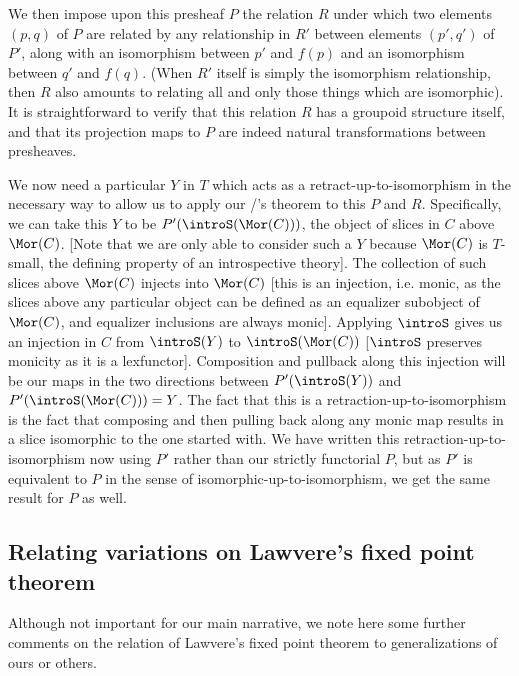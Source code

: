 We then impose upon this presheaf $P$ the relation $R$ under which two elements $(p, q)$ of $P$ are related by any relationship in $R'$ between elements $(p', q')$ of $P'$, along with an isomorphism between $p'$ and $f(p)$ and an isomorphism between $q'$ and $f(q)$. (When $R'$ itself is simply the isomorphism relationship, then $R$ also amounts to relating all and only those things which are isomorphic). It is straightforward to verify that this relation $R$ has a groupoid structure itself, and that its projection maps to $P$ are indeed natural transformations between presheaves. 

We now need a particular $Y$ in $T$ which acts as a retract-up-to-isomorphism in the necessary way to allow us to apply our \Loeb/'s theorem to this $P$ and $R$. Specifically, we can take this $Y$ to be $P'(\introS(\Mor(C)))$, the object of slices in $C$ above $\Mor(C)$. [Note that we are only able to consider such a $Y$ because $\Mor(C)$ is $T$-small, the defining property of an introspective theory]. The collection of such slices above $\Mor(C)$ injects into $\Mor(C)$ [this is an injection, i.e. monic, as the slices above any particular object can be defined as an equalizer subobject of $\Mor(C)$, and equalizer inclusions are always monic]. Applying $\introS$ gives us an injection in $C$ from $\introS(Y)$ to $\introS(\Mor(C))$ [$\introS$ preserves monicity as it is a lexfunctor]. Composition and pullback along this injection will be our maps in the two directions between $P'(\introS(Y))$ and $P'(\introS(\Mor(C))) = Y$. The fact that this is a retraction-up-to-isomorphism is the fact that composing and then pulling back along any monic map results in a slice isomorphic to the one started with. We have written this retraction-up-to-isomorphism now using $P'$ rather than our strictly functorial $P$, but as $P'$ is equivalent to $P$ in the sense of isomorphic-up-to-isomorphism, we get the same result for $P$ as well. 

\subsection{Relating variations on Lawvere's fixed point theorem}
Although not important for our main narrative, we note here some further comments on the relation of Lawvere's fixed point theorem to generalizations of ours or others.

